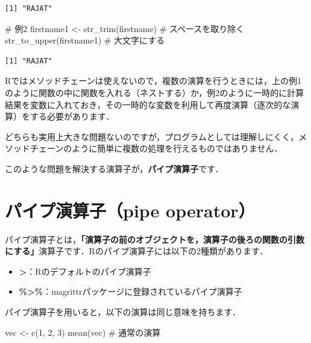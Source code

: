 \documentclass[
  letterpaper,
  DIV=11,
  numbers=noendperiod]{scrreprt}
\newenvironment{Shaded}{\begin{snugshade}}{\end{snugshade}}
\newcommand{\CommentTok}[1]{\textcolor[rgb]{0.37,0.37,0.37}{#1}}
\newcommand{\DecValTok}[1]{\textcolor[rgb]{0.68,0.00,0.00}{#1}}
\newcommand{\FunctionTok}[1]{\textcolor[rgb]{0.28,0.35,0.67}{#1}}
\newcommand{\NormalTok}[1]{\textcolor[rgb]{0.00,0.23,0.31}{#1}}
\newcommand{\OtherTok}[1]{\textcolor[rgb]{0.00,0.23,0.31}{#1}}
\providecommand{\tightlist}{%
  \setlength{\itemsep}{0pt}\setlength{\parskip}{0pt}}\usepackage{longtable,booktabs,array}
\begin{document}
\begin{verbatim}
[1] "RAJAT"
\end{verbatim}

\begin{Shaded}
\begin{Highlighting}[]
\CommentTok{\# 例2}
\NormalTok{firstname1 }\OtherTok{\textless{}{-}} \FunctionTok{str\_trim}\NormalTok{(firstname) }\CommentTok{\# スペースを取り除く}
\FunctionTok{str\_to\_upper}\NormalTok{(firstname1) }\CommentTok{\# 大文字にする}
\end{Highlighting}
\end{Shaded}

\begin{verbatim}
[1] "RAJAT"
\end{verbatim}

Rではメソッドチェーンは使えないので，複数の演算を行うときには，上の例1のように関数の中に関数を入れる（ネストする）か，例2のように一時的に計算結果を変数に入れておき，その一時的な変数を利用して再度演算（逐次的な演算）をする必要があります．

どちらも実用上大きな問題ないのですが，プログラムとしては理解しにくく，メソッドチェーンのように簡単に複数の処理を行えるものではありません．

このような問題を解決する演算子が，\textbf{パイプ演算子}です．

\hypertarget{ux30d1ux30a4ux30d7ux6f14ux7b97ux5b50pipe-operator}{%
\section{パイプ演算子（pipe
operator）}\label{ux30d1ux30a4ux30d7ux6f14ux7b97ux5b50pipe-operator}}

パイプ演算子とは，\textbf{「演算子の前のオブジェクトを，演算子の後ろの関数の引数にする」}演算子です．Rのパイプ演算子には以下の2種類があります．

\begin{itemize}
\tightlist
\item
  \textbf{\textbar\textgreater{}}：Rのデフォルトのパイプ演算子
\item
  \textbf{\%\textgreater\%}：magrittrパッケージに登録されているパイプ演算子
\end{itemize}

パイプ演算子を用いると，以下の演算は同じ意味を持ちます．

\begin{Shaded}
\begin{Highlighting}[]
\NormalTok{vec }\OtherTok{\textless{}{-}} \FunctionTok{c}\NormalTok{(}\DecValTok{1}\NormalTok{, }\DecValTok{2}\NormalTok{, }\DecValTok{3}\NormalTok{)}
\FunctionTok{mean}\NormalTok{(vec) }\CommentTok{\# 通常の演算}
\end{Highlighting}
\end{Shaded}
\end{document}
